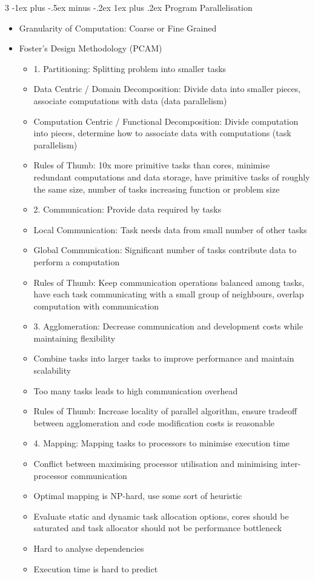 \documentclass[10pt, landscape]{article}
\makeatletter
\renewcommand{\subsection}{\@startsection{subsection}{3}{0mm}%
                                {-1ex plus -.5ex minus -.2ex}%
                                {1ex plus .2ex}%
                                {\normalfont\small\bfseries}}%
\makeatother
\begin{document}
\begin{multicols*}{3}
\subsection{Program Parallelisation}
\begin{itemize}
    \item Granularity of Computation: Coarse or Fine Grained
    \item Foster's Design Methodology (PCAM)
    \begin{itemize}
        \item 1. Partitioning: Splitting problem into smaller tasks
        \item Data Centric / Domain Decomposition: Divide data into smaller pieces, associate computations with data (data parallelism)
        \item Computation Centric / Functional Decomposition: Divide computation into pieces, determine how to associate data with computations (task parallelism)
        \item Rules of Thumb: 10x more primitive tasks than cores, minimise redundant computations and data storage, have primitive tasks of roughly the same size, number of tasks increasing function or problem size
        \item 2. Communication: Provide data required by tasks
        \item Local Communication: Task needs data from small number of other tasks
        \item Global Communication: Significant number of tasks contribute data to perform a computation
        \item Rules of Thumb: Keep communication operations balanced among tasks, have each task communicating with a small group of neighbours, overlap computation with communication
        \item 3. Agglomeration: Decrease communication and development costs while maintaining flexibility
        \item Combine tasks into larger tasks to improve performance and maintain scalability
        \item Too many tasks leads to high communication overhead
        \item Rules of Thumb: Increase locality of parallel algorithm, ensure tradeoff between agglomeration and code modification costs is reasonable
        \item 4. Mapping: Mapping tasks to processors to minimise execution time
        \item Conflict between maximising processor utilisation and minimising inter-processor communication
        \item Optimal mapping is NP-hard, use some sort of heuristic
        \item Evaluate static and dynamic task allocation options, cores should be saturated and task allocator should not be performance bottleneck
        \item Hard to analyse dependencies
        \item Execution time is hard to predict
    \end{itemize}
\end{itemize}


\end{multicols*}
\end{document}

